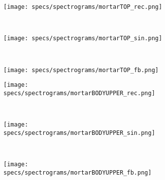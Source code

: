 \begin{figure}[H]
    \centering
    \begin{subfigure}[b]{0.25\textwidth}
        \texttt{[image: specs/spectrograms/mortarTOP\_rec.png]}
    \end{subfigure}%
    ~ %
    \begin{subfigure}[b]{0.25\textwidth}
        \texttt{[image: specs/spectrograms/mortarTOP\_sin.png]}
    \end{subfigure}%
    ~ %
    \begin{subfigure}[b]{0.25\textwidth}
        \texttt{[image: specs/spectrograms/mortarTOP\_fb.png]}
    \end{subfigure}%
      
    \begin{subfigure}[b]{0.25\textwidth}
        \texttt{[image: specs/spectrograms/mortarBODYUPPER\_rec.png]}
    \end{subfigure}%
    ~ %
    \begin{subfigure}[b]{0.25\textwidth}
        \texttt{[image: specs/spectrograms/mortarBODYUPPER\_sin.png]}
    \end{subfigure}%
    ~ %
    \begin{subfigure}[b]{0.25\textwidth}
        \texttt{[image: specs/spectrograms/mortarBODYUPPER\_fb.png]}
    \end{subfigure}%
    \end{figure}
